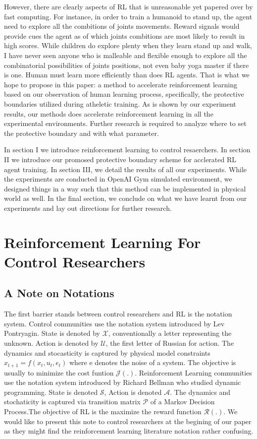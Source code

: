 \documentclass[journal]{IEEEtran}
\begin{document}
However, there are clearly aspects of RL that is unreasonable yet papered over by fast computing. For instance, in order to train a humanoid to stand up, the agent need to explore all the combitions of joints movements. Reward signals would provide cues the agent as of which joints combitions are most likely to result in high scores. While children do explore plenty when they learn stand up and walk, I have never seen anyone who is malleable and flexible enough to explore all the combinatorial possibilities of joints positions, not even baby yoga master if there is one. Human must learn more efficiently than does RL agents. That is what we hope to propose in this paper: a method to accelerate reinforcement learning based on our observation of human learning process, specifically, the protective boundaries utilized during atheletic training. As is shown by our experiment results, our methods does accelerate reinforcement learning in all the experimental environments. Further research is required to analyze where to set the protective boundary and with what parameter.

In section I we introduce reinforcement learning to control resaerchers. In section II we introduce our promosed protective boundary scheme for acclerated RL agent training. In section III, we detail the results of all our experiments. While the experiments are conducted in OpenAI Gym simulated environment, we designed things in a way such that this method can be implemented in physical world as well. In the final section, we conclude on what we have learnt from our experiments and lay out directions for further research.

\section{Reinforcement Learning For Control Researchers}

\subsection{A Note on Notations}
The first barrier stands between control researchers and RL is the notation system. Control communities use the notation system introduced by Lev Pontryagin. State is denoted by $ \mathcal{X}$, conventionally a letter representing the unknown. Action is denoted by $\mathcal{U}$, the first letter of Russian for action. The dynamics and stocasticity is captured by physical model constraints $x_{t+1}=f(x_t,u_t,e_t)$ where e denotes the noise of a system. The objective is usually to minimize the cost funtion $\mathcal{J(.)}$. Reinforcement Learning communities use the notation system introduced by Richard Bellman who studied dynamic programming. State is denoted $\mathcal{S}$, Action is denoted $\mathcal{A}$. The dynamics and stochaticity is captured via transition matrix $\mathcal{P}$ of a Markov Decision Process.The objective of RL is the maximize the reward function $\mathcal{R(.)}$. We would like to present this note to control researchers at the begining of our paper as they might find the reinforcement learning literature notation rather confusing.
\end{document}
